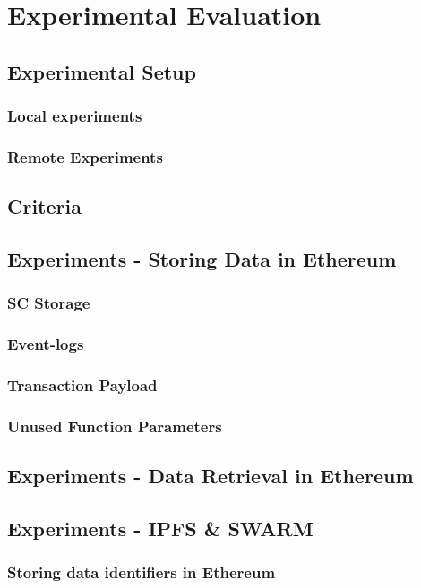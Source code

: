 \chapter{Experimental Evaluation}\label{chapter:experiments}
\section{Experimental Setup}\label{sec:}
\subsection{Local experiments}\label{sec:}
\subsection{Remote Experiments}\label{sec:}
\section{Criteria}\label{sec:}
\section{Experiments - Storing Data in Ethereum}\label{sec:}
\subsection{SC Storage}\label{subsection:}
\subsection{Event-logs}\label{subsection:}
\subsection{Transaction Payload}\label{subsection:}
\subsection{Unused Function Parameters}\label{subsection:}
\section{Experiments - Data Retrieval in Ethereum}\label{sec:}
\section{Experiments - IPFS \& SWARM}\label{sec:}
\subsection{Storing data identifiers in Ethereum}\label{subsection:}
